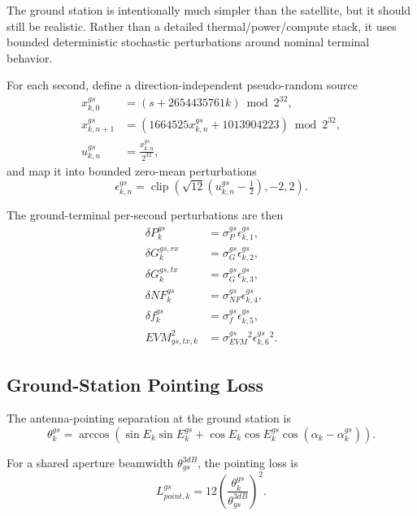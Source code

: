 \documentclass[11pt]{article}
\newcommand{\clip}{\operatorname{clip}}
\begin{document}
The ground station is intentionally much simpler than the satellite, but it should still
be realistic. Rather than a detailed thermal/power/compute stack, it uses bounded
deterministic stochastic perturbations around nominal terminal behavior.

For each second, define a direction-independent pseudo-random source
\begin{align}
  x^{gs}_{k,0}
  &= \left(s + 2654435761k\right)\bmod 2^{32}, \\
  x^{gs}_{k,n+1}
  &= \left(1664525x^{gs}_{k,n} + 1013904223\right)\bmod 2^{32}, \\
  u^{gs}_{k,n}
  &= \frac{x^{gs}_{k,n}}{2^{32}},
\end{align}
and map it into bounded zero-mean perturbations
\begin{equation}
  \epsilon^{gs}_{k,n}
  =
  \clip\left(\sqrt{12}\left(u^{gs}_{k,n} - \tfrac{1}{2}\right), -2, 2\right).
\end{equation}

The ground-terminal per-second perturbations are then
\begin{align}
  \delta P^{gs}_k &= \sigma^{gs}_{P}\epsilon^{gs}_{k,1}, \\
  \delta G^{gs,rx}_k &= \sigma^{gs}_{G}\epsilon^{gs}_{k,2}, \\
  \delta G^{gs,tx}_k &= \sigma^{gs}_{G}\epsilon^{gs}_{k,3}, \\
  \delta NF^{gs}_k &= \sigma^{gs}_{NF}\epsilon^{gs}_{k,4}, \\
  \delta f^{gs}_k &= \sigma^{gs}_{f}\epsilon^{gs}_{k,5}, \\
  EVM^{2}_{gs,tx,k} &= \sigma^{gs}_{EVM}{}^{2}\epsilon^{gs}_{k,6}{}^{2}.
\end{align}

\subsection{Ground-Station Pointing Loss}

The antenna-pointing separation at the ground station is
\begin{equation}
  \theta^{gs}_k
  =
  \arccos \left(
    \sin E_k \sin E^{gs}_k
    +
    \cos E_k \cos E^{gs}_k \cos(\alpha_k - \alpha^{gs}_k)
  \right).
\end{equation}

For a shared aperture beamwidth $\theta^{3dB}_{gs}$, the pointing loss is
\begin{equation}
  L^{gs}_{point,k}
  =
  12 \left( \frac{\theta^{gs}_k}{\theta^{3dB}_{gs}} \right)^2.
\end{equation}
\end{document}
